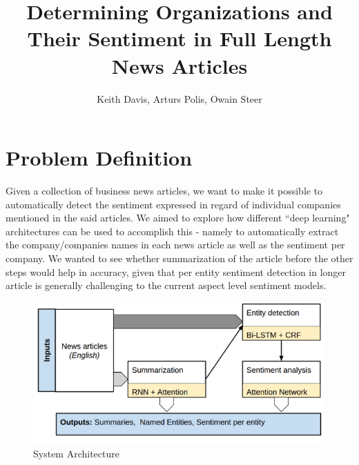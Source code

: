 \documentclass[12pt,a4paper]{article}
\title{\LARGE \bf
Determining Organizations and Their Sentiment in Full Length News Articles
}
\author{Keith Davis, Arturs Polis, Owain Steer}
\begin{document}
\maketitle






\section{Problem Definition}
Given a collection of business news articles, we want to make it possible to automatically detect the sentiment expressed in regard of individual companies mentioned in the said articles. We aimed to explore how different ``deep learning" architectures can be used to accomplish this - namely to automatically extract the company/companies names in each news article as well as the sentiment per company. We wanted to see whether summarization of the article before the other steps would help in accuracy, given that per entity sentiment detection in longer article is generally challenging to the current aspect level sentiment models. \\ 

\begin{figure}[H]
  \centering
  \includegraphics[scale=0.6]{approach.png}
  \caption{System Architecture}
  \label{fig:network_performance}
\end{figure}
\end{document}
